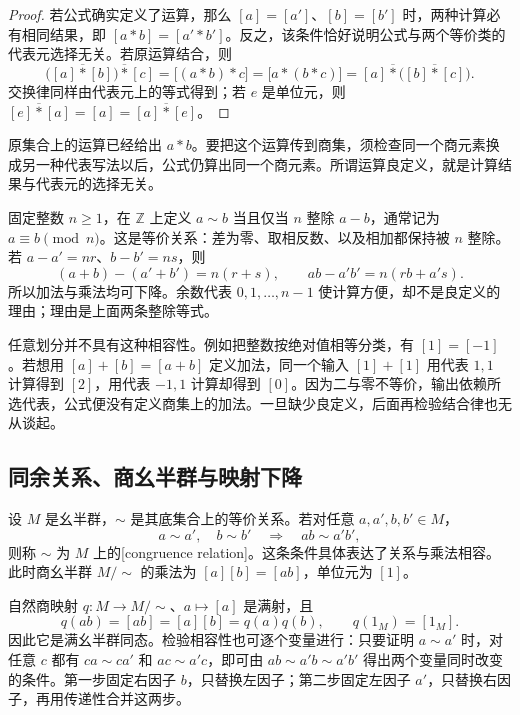 \begin{proof}
	若公式确实定义了运算，那么 \([a]=[a']\)、\([b]=[b']\) 时，两种计算必有相同结果，即 \([a*b]=[a'*b']\)。反之，该条件恰好说明公式与两个等价类的代表元选择无关。若原运算结合，则
	\[
		\bigl([a]\mathbin{\overline *}[b]\bigr)\mathbin{\overline *}[c] =\bigl[(a*b)*c\bigr]=\bigl[a*(b*c)\bigr] =[a]\mathbin{\overline *}\bigl([b]\mathbin{\overline *}[c]\bigr).
	\]
	交换律同样由代表元上的等式得到；若 \(e\) 是单位元，则 \([e]\mathbin{\overline *}[a]=[a]=[a]\mathbin{\overline *}[e]\)。
\end{proof}

原集合上的运算已经给出 \(a*b\)。要把这个运算传到商集，须检查同一个商元素换成另一种代表写法以后，公式仍算出同一个商元素。所谓运算良定义，就是计算结果与代表元的选择无关。

\ProseParagraphBreak
固定整数 \(n\geq1\)，在 \(\mathbb Z\) 上定义 \(a\sim b\) 当且仅当 \(n\) 整除 \(a-b\)，通常记为 \(a\equiv b\pmod n\)。这是等价关系：差为零、取相反数、以及相加都保持被 \(n\) 整除。若 \(a-a'=nr\)、\(b-b'=ns\)，则
\[
	(a+b)-(a'+b')=n(r+s),\qquad ab-a'b'=n(rb+a's).
\]
所以加法与乘法均可下降。余数代表 \(0,1,\ldots,n-1\) 使计算方便，却不是良定义的理由；理由是上面两条整除等式。

\ProseParagraphBreak
任意划分并不具有这种相容性。例如把整数按绝对值相等分类，有 \([1]=[-1]\)。若想用 \([a]+[b]=[a+b]\) 定义加法，同一个输入 \([1]+[1]\) 用代表 \(1,1\) 计算得到 \([2]\)，用代表 \(-1,1\) 计算却得到 \([0]\)。因为二与零不等价，输出依赖所选代表，公式便没有定义商集上的加法。一旦缺少良定义，后面再检验结合律也无从谈起。

\subsection{同余关系、商幺半群与映射下降}
\label{b1:subsec:0103:03}

\begin{definition}\label{b1:def:congruence}
	设 \(M\) 是幺半群，\(\sim\) 是其底集合上的等价关系。若对任意 \(a,a',b,b'\in M\)，
	\[
		a\sim a',\quad b\sim b'\quad\Longrightarrow\quad ab\sim a'b',
	\]
	则称 \(\sim\) 为 \(M\) 上的[congruence relation]。这条条件具体表达了关系与乘法相容。此时商幺半群 \(M/{\sim}\) 的乘法为 \([a][b]=[ab]\)，单位元为 \([1]\)。
\end{definition}

自然商映射 \(q:M\rightarrow M/{\sim}\)、\(a\mapsto[a]\) 是满射，且
\[
	q(ab)=[ab]=[a][b]=q(a)q(b),\qquad q(1_M)=[1_M].
\]
因此它是满幺半群同态。检验相容性也可逐个变量进行：只要证明 \(a\sim a'\) 时，对任意 \(c\) 都有 \(ca\sim ca'\) 和 \(ac\sim a'c\)，即可由 \(ab\sim a'b\sim a'b'\) 得出两个变量同时改变的条件。第一步固定右因子 \(b\)，只替换左因子；第二步固定左因子 \(a'\)，只替换右因子，再用传递性合并这两步。

